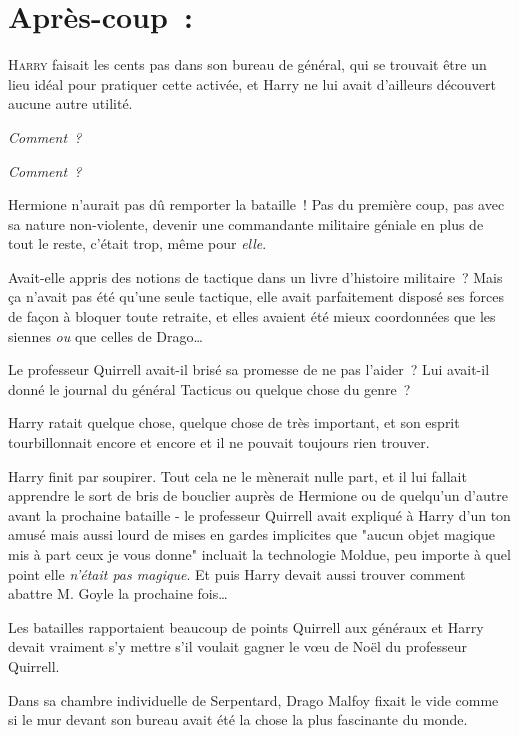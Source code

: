 
\section{Après-coup~:}

\lettrine{H}{arry} faisait les cents pas dans son bureau de général, qui se trouvait être un lieu idéal pour pratiquer cette activée, et Harry ne lui avait d'ailleurs découvert aucune autre utilité.

\emph{Comment~?}

\emph{Comment~?}

Hermione n'aurait pas dû remporter la bataille~! Pas du première coup, pas avec sa nature non-violente, devenir une commandante militaire géniale en plus de tout le reste, c'était trop, même pour \emph{elle}.

Avait-elle appris des notions de tactique dans un livre d'histoire militaire~? Mais ça n'avait pas été qu'une seule tactique, elle avait parfaitement disposé ses forces de façon à bloquer toute retraite, et elles avaient été mieux coordonnées que les siennes \emph{ou} que celles de Drago…

Le professeur Quirrell avait-il brisé sa promesse de ne pas l'aider~? Lui avait-il donné le journal du général Tacticus ou quelque chose du genre~?

Harry ratait quelque chose, quelque chose de très important, et son esprit tourbillonnait encore et encore et il ne pouvait toujours rien trouver.

Harry finit par soupirer. Tout cela ne le mènerait nulle part, et il lui fallait apprendre le sort de bris de bouclier auprès de Hermione ou de quelqu'un d'autre avant la prochaine bataille - le professeur Quirrell avait expliqué à Harry d'un ton amusé mais aussi lourd de mises en gardes implicites que "aucun objet magique mis à part ceux je vous donne" incluait la technologie Moldue, peu importe à quel point elle \emph{n'était pas magique}. Et puis Harry devait aussi trouver comment abattre M. Goyle la prochaine fois…

Les batailles rapportaient beaucoup de points Quirrell aux généraux et Harry devait vraiment s'y mettre s'il voulait gagner le vœu de Noël du professeur Quirrell.

\later

Dans sa chambre individuelle de Serpentard, Drago Malfoy fixait le vide comme si le mur devant son bureau avait été la chose la plus fascinante du monde.


